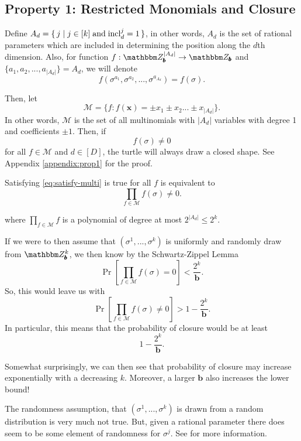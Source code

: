 \documentclass[11pt,titlepage]{article}
\newcommand{\inclIndic}[2]{{\mathrm{incl}_{#1}^{#2}}}
\newcommand{\digSumPeriodic}{\sigma^j}
\newcommand{\digSumPeriodicNoJ}{{\sigma}}
\newcommand{\commonBase}{{\pmb{b}}}
\begin{document}
\subsection{Property 1: Restricted Monomials and Closure}
Define $A_d = \set{j \mid j \in [k] \; \text{and}\; \inclIndic{d}{j} = 1}$, in other words,
$A_d$ is the set of rational parameters which are included in determining the position along the $d$th dimension.
Also, for function $f: \Z_\commonBase^{|A_d|} \rightarrow \Z_\commonBase$ and $\{a_1, a_2, ..., a_{|A_d|} \} = A_d$, we will denote
$$
  f\left(\digSumPeriodicNoJ^{a_1}, \digSumPeriodicNoJ^{a_2}, ..., \digSumPeriodicNoJ^{a_{A_d}}\right)
  = f\left(\digSumPeriodicNoJ\right).
$$

Then, let
$$
\mathcal{M} = \{f : f(\pmb{x}) = \pm x_1 \pm x_2 ... \pm x_{|A_d|}\}.
$$
In other words, $\mathcal{M}$ is the set of all multinomials with $|A_d|$ variables with
degree 1 and coefficients $\pm1$.
Then,
if \begin{equation}
\label{eq:satisfy-multi}
f\left(\digSumPeriodicNoJ\right) \neq 0
\end{equation}
for all $f \in \mathcal{M}$ and $d \in [D]$, the turtle will always draw a closed shape. See 
Appendix \ref{appendix:prop1} for the proof.

Satisfying \eqref{eq:satisfy-multi} is true for all $f$ is equivalent to
$$
  \prod_{f \in \mathcal{M}} f(\digSumPeriodicNoJ) \neq 0.
$$

where $\prod_{f \in \mathcal{M}} f$ is a polynomial of degree
at most $2^{|A_d|} \leq 2^k$.

If we were to then assume that $(\digSumPeriodicNoJ^1, ..., \digSumPeriodicNoJ^k)$ 
is uniformly and randomly draw from $\Z_\commonBase^k$, we then know by the 
Schwartz-Zippel Lemma
$$
  \Pr\left[\prod_{f \in \mathcal{M}} f(\digSumPeriodicNoJ) = 0\right] < \frac{2^k}{\commonBase}.
$$
So, this would leave us with
$$
  \Pr\left[\prod_{f \in \mathcal{M}} f(\digSumPeriodicNoJ) \neq 0\right] > 1 - \frac{2^k}{\commonBase}.
$$
In particular, this means that the probability of closure would be at least
$$
1 - \frac{2^k}{\commonBase}.
$$

Somewhat surprisingly, we can then see that probability of closure may increase exponentially
with a decreasing $k$. Moreover, a larger $\commonBase$ also increases the lower bound!

\begin{remark}
  The randomness assumption, that $(\digSumPeriodicNoJ^1, ..., \digSumPeriodicNoJ^k)$
  is drawn from a random distribution is very much not true. But, given a rational parameter
  there does seem to be some element of randomness for $\digSumPeriodic$. See \cite{OnDecSeq} for more information.
\end{remark}
\end{document}
